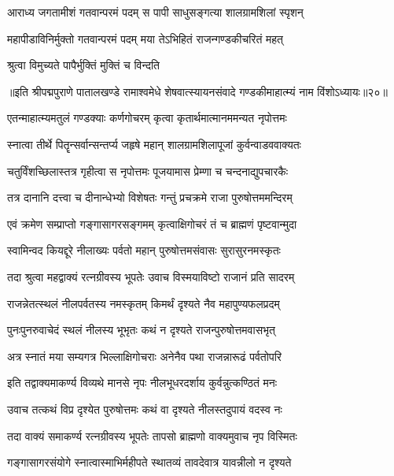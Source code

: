 \twolineshloka
{आराध्य जगतामीशं गतवान्परमं पदम्}
{स पापी साधुसङ्गत्या शालग्रामशिलां स्पृशन्}%

\twolineshloka
{महापीडाविनिर्मुक्तो गतवान्परमं पदम्}
{मया तेऽभिहितं राजन्गण्डकीचरितं महत्}%

\onelineshloka
{श्रुत्वा विमुच्यते पापैर्भुक्तिं मुक्तिं च विन्दति}%

॥इति श्रीपद्मपुराणे पातालखण्डे रामाश्वमेधे शेषवात्स्यायनसंवादे गण्डकीमाहात्म्यं नाम विंशोऽध्यायः॥२०॥



\twolineshloka
{एतन्माहात्म्यमतुलं गण्डक्याः कर्णगोचरम्}
{कृत्वा कृतार्थमात्मानममन्यत नृपोत्तमः}%

\twolineshloka
{स्नात्वा तीर्थे पितॄन्सर्वान्सन्तर्प्य जहृषे महान्}
{शालग्रामशिलापूजां कुर्वन्वाडववाक्यतः}%

\twolineshloka
{चतुर्विंशच्छिलास्तत्र गृहीत्वा स नृपोत्तमः}
{पूजयामास प्रेम्णा च चन्दनाद्युपचारकैः}%

\twolineshloka
{तत्र दानानि दत्त्वा च दीनान्धेभ्यो विशेषतः}
{गन्तुं प्रचक्रमे राजा पुरुषोत्तममन्दिरम्}%

\twolineshloka
{एवं क्रमेण सम्प्राप्तो गङ्गासागरसङ्गमम्}
{कृत्वाक्षिगोचरं तं च ब्राह्मणं पृष्टवान्मुदा}%

\twolineshloka
{स्वामिन्वद कियद्दूरे नीलाख्यः पर्वतो महान्}
{पुरुषोत्तमसंवासः सुरासुरनमस्कृतः}%

\twolineshloka
{तदा श्रुत्वा महद्वाक्यं रत्नग्रीवस्य भूपतेः}
{उवाच विस्मयाविष्टो राजानं प्रति सादरम्}%

\twolineshloka
{राजन्नेतत्स्थलं नीलपर्वतस्य नमस्कृतम्}
{किमर्थं दृश्यते नैव महापुण्यफलप्रदम्}%

\twolineshloka
{पुनःपुनरुवाचेदं स्थलं नीलस्य भूभृतः}
{कथं न दृश्यते राजन्पुरुषोत्तमवासभृत्}%

\twolineshloka
{अत्र स्नातं मया सम्यगत्र भिल्लाक्षिगोचराः}
{अनेनैव पथा राजन्नारूढं पर्वतोपरि}%

\twolineshloka
{इति तद्वाक्यमाकर्ण्य विव्यथे मानसे नृपः}
{नीलभूधरदर्शाय कुर्वन्नुत्कण्ठितं मनः}%

\twolineshloka
{उवाच तत्कथं विप्र दृश्येत पुरुषोत्तमः}
{कथं वा दृश्यते नीलस्तदुपायं वदस्व नः}%

\twolineshloka
{तदा वाक्यं समाकर्ण्य रत्नग्रीवस्य भूपतेः}
{तापसो ब्राह्मणो वाक्यमुवाच नृप विस्मितः}%

\twolineshloka
{गङ्गासागरसंयोगे स्नात्वास्माभिर्महीपते}
{स्थातव्यं तावदेवात्र यावन्नीलो न दृश्यते}%

